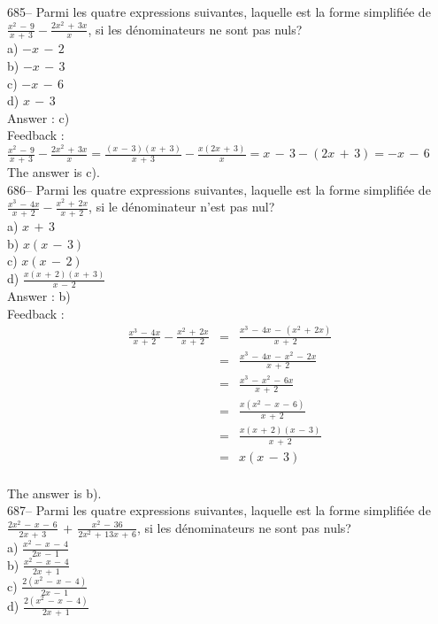 ﻿\documentclass[letterpaper, 12pt]{article}
\begin{document}
685-- Parmi les quatre expressions suivantes, laquelle est la forme
simplifi\'ee de $\frac{x^{2}\,-\,9}{x\,+\,3}-\frac{2x^{2}\,+\,3x}{x}$, si
les d\'enominateurs ne sont pas nuls?\\
a) $-x\,-\,2$\\
b) $-x\,-\,3$\\
c) $-x\,-\,6$\\
d) $x\,-\,3$\\

Answer : c)\\

Feedback : \\[2mm]
$\frac{x^{2}\,-\,9}{x\,+\,3}-\frac{2x^{2}\,+\,3x}{x}=\frac{\left(
x\,-\,3\right) \left( x\,+\,3\right) }{x\,+\,3} -\frac{x\left(
2x\,+\,3\right) }{x}=x\,-\,3-\left( 2x\,+\,3\right) =-x\,-\,6$\\[2mm]
The answer is c).\\

686-- Parmi les quatre expressions suivantes, laquelle est la forme
simplifi\'ee de $\frac{x^{3}\,-\,4x}{x\,+\,2}-\frac{x^{2}\,+\,2x}{x\,+\,2}$,
si le d\'enominateur n'est pas nul?\\
a) $ x\,+\,3$\\[2mm]
b) $x\left( x\,-\,3\right) $\\[2mm]
c) $x\left( x\,-\,2\right) $\\[2mm]
d) $\frac{x\left( x\,+\,2\right) \left( x\,+\,3\right)}{x\,-\,2}$\\

Answer : b)\\

Feedback : \\
\begin{eqnarray*}
\frac{x^{3}\,-\,4x}{x\,+\,2}-\frac{x^{2}\,+\,2x}{x\,+\,2}&=&\frac{x^{3}\,-\,4x\,-\,(x^{2}\,+\,2x)}{x\,+\,2}\\[2mm]
&=&\frac{x^{3}\,-\,4x\,-\,x^{2}\,-\,2x}{x\,+\,2}\\[2mm]
&=&\frac{x^{3}\,-\,x^{2}\,-\,6x}{x\,+\,2}\\[2mm]
&=&\frac{x(x^{2}\,-\,x\,-\,6)}{x\,+\,2}\\[2mm]
&=&\frac{x(x\,+\,2)(x\,-\,3)}{x\,+\,2}\\[2mm]
&=&x(x\,-\,3)\\
\end{eqnarray*}

The answer is b).\\

687-- Parmi les quatre expressions suivantes, laquelle est la forme
simplifi\'ee de
$\frac{2x^{2}\,-\,x\,-\,6}{2x\,+\,3}\,+\,\frac{x^{2}\,-\,36}{2x^{2}\,+\,13x\,+\,6}$,
si les d\'enominateurs ne sont pas nuls?\\
a) $\frac{x^{2}\,-\,x\,-\,4}{2x\,-\,1}$\\[2mm]
b) $\frac{x^{2}\,-\,x\,-\,4}{2x\,+\,1}$\\[2mm]
c) $\frac{2(x^{2}\,-\,x\,-\,4)}{2x\,-\,1}$\\[2mm]
d) $\frac{2(x^{2}\,-\,x\,-\,4)}{2x\,+\,1}$\\[2mm]
\end{document}
